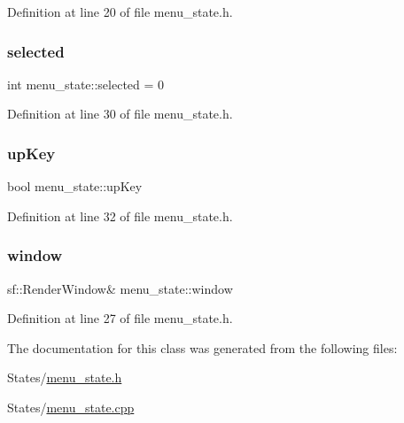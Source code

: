 Definition at line 20 of file menu\+\_\+state.\+h.

\hypertarget{classmenu__state_a256be5c2a9daab653607841f6b990599}{}\label{classmenu__state_a256be5c2a9daab653607841f6b990599} 
\subsubsection{\texorpdfstring{selected}{selected}}
{\footnotesize\ttfamily int menu\+\_\+state\+::selected = 0\hspace{0.3cm}{\ttfamily [protected]}}



Definition at line 30 of file menu\+\_\+state.\+h.

\hypertarget{classmenu__state_adb6204412ee77221d8bec5b407f71f0f}{}\label{classmenu__state_adb6204412ee77221d8bec5b407f71f0f} 
\subsubsection{\texorpdfstring{up\+Key}{upKey}}
{\footnotesize\ttfamily bool menu\+\_\+state\+::up\+Key\hspace{0.3cm}{\ttfamily [protected]}}



Definition at line 32 of file menu\+\_\+state.\+h.

\hypertarget{classmenu__state_afa6e057ae20ebf8981364d97d08165a3}{}\label{classmenu__state_afa6e057ae20ebf8981364d97d08165a3} 
\subsubsection{\texorpdfstring{window}{window}}
{\footnotesize\ttfamily sf\+::\+Render\+Window\& menu\+\_\+state\+::window}



Definition at line 27 of file menu\+\_\+state.\+h.



The documentation for this class was generated from the following files\+:\begin{DoxyCompactItemize}
\item 
States/\hyperlink{menu__state_8h}{menu\+\_\+state.\+h}\item 
States/\hyperlink{menu__state_8cpp}{menu\+\_\+state.\+cpp}\end{DoxyCompactItemize}

